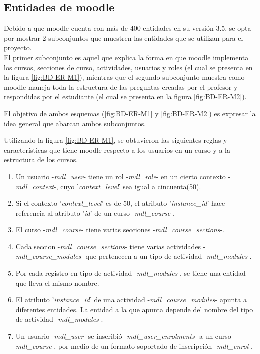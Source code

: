 
\subsection{Entidades de moodle}

Debido a que moodle cuenta con más de 400 entidades en su versión 3.5, se opta
por mostrar 2 subconjuntos que muestren las entidades que se utilizan para el proyecto.\\

\noindent El primer subconjunto es aquel que explica la forma en que moodle implementa los cursos,
secciones de curso, actividades, usuarios y roles (el cual se presenta en la figura \ref{fig:BD-ER-M1}),
mientras que el segundo subconjunto muestra como moodle maneja toda la
estructura de las preguntas creadas por el profesor y respondidas por el estudiante
(el cual se presenta en la figura \ref{fig:BD-ER-M2}).

\noindent El objetivo de ambos esquemas (\ref{fig:BD-ER-M1} y \ref{fig:BD-ER-M2}) es expresar la idea general que abarcan ambos subconjuntos.

\clearpage
{}


\noindent Utilizando la figura \ref{fig:BD-ER-M1}, se obtuvieron las siguientes reglas y características que tiene moodle respecto a los usuarios en un curso y a la estructura de los cursos.
\begin{enumerate}
    \item Un usuario -{\it mdl\_user}- tiene un rol -{\it mdl\_role}- en un cierto contexto -{\it mdl\_context}-, cuyo  '{\it context\_level}' sea igual a cincuenta(50).
    \item Si el contexto '{\it context\_level}' es de 50, el atributo '{\it instance\_id}' hace referencia al atributo '{\it id}' de un curso -{\it mdl\_course}-.
    \item El curso -{\it mdl\_course}- tiene varias secciones -{\it mdl\_course\_sections}-.
    \item Cada seccion -{\it mdl\_course\_sections}- tiene varias actividades -{\it mdl\_course\_modules}- que pertenecen a un tipo de actividad -{\it mdl\_modules}-.
    \item Por cada registro en tipo de actividad -{\it mdl\_modules}-, se tiene una entidad que lleva el mismo nombre.
    \item El atributo '{\it instance\_id}' de una actividad  -{\it mdl\_course\_modules}- apunta a diferentes entidades. La entidad a la que apunta depende del nombre del tipo de actividad -{\it mdl\_modules}-.
    \item Un usuario -{\it mdl\_user}- se inscribió -{\it mdl\_user\_enrolments}- a un curso -{\it mdl\_course}-, por medio de un formato soportado de inscripción -{\it mdl\_enrol}-.
\end{enumerate}


